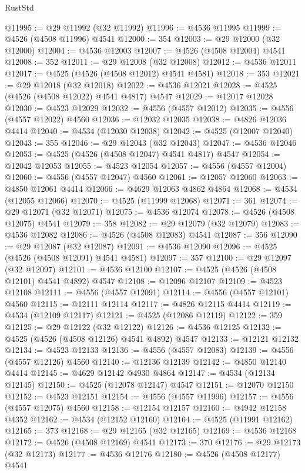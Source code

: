 \begin{lexlean}{RustStd}
\begin{coremodule}
@11995 := @29 @11992 (@32 @11992)
@11996 := @4536 @11995
@11999 := @4526 (@4508 @11996) @4541
@12000 := 354
@12003 := @29 @12000 (@32 @12000)
@12004 := @4536 @12003
@12007 := @4526 (@4508 @12004) @4541
@12008 := 352
@12011 := @29 @12008 (@32 @12008)
@12012 := @4536 @12011
@12017 := @4525 (@4526 (@4508 @12012) @4541 @4581)
@12018 := 353
@12021 := @29 @12018 (@32 @12018)
@12022 := @4536 @12021
@12028 := @4525 (@4526 (@4508 @12022) @4541 @4817) @4547
@12029 := @12017 @12028
@12030 := @4523 @12029
@12032 := @4556 (@4557 @12012)
@12035 := @4556 (@4557 @12022) @4560
@12036 := @12032 @12035
@12038 := @4826 @12036 @4414
@12040 := @4534 (@12030 @12038)
@12042 := @4525 (@12007 @12040)
@12043 := 355
@12046 := @29 @12043 (@32 @12043)
@12047 := @4536 @12046
@12053 := @4525 (@4526 (@4508 @12047) @4541 @4817) @4547
@12054 := @12042 @12053
@12055 := @4523 @12054
@12057 := @4556 (@4557 @12004)
@12060 := @4556 (@4557 @12047) @4560
@12061 := @12057 @12060
@12063 := @4850 @12061 @4414
@12066 := @4629 @12063 @4862 @4864
@12068 := @4534 (@12055 @12066)
@12070 := @4525 (@11999 @12068)
@12071 := 361
@12074 := @29 @12071 (@32 @12071)
@12075 := @4536 @12074
@12078 := @4526 (@4508 @12075) @4541
@12079 := 358
@12082 := @29 @12079 (@32 @12079)
@12083 := @4536 @12082
@12086 := @4526 (@4508 @12083) @4541
@12087 := 356
@12090 := @29 @12087 (@32 @12087)
@12091 := @4536 @12090
@12096 := @4525 (@4526 (@4508 @12091) @4541 @4581)
@12097 := 357
@12100 := @29 @12097 (@32 @12097)
@12101 := @4536 @12100
@12107 := @4525 (@4526 (@4508 @12101) @4541 @4892) @4547
@12108 := @12096 @12107
@12109 := @4523 @12108
@12111 := @4556 (@4557 @12091)
@12114 := @4556 (@4557 @12101) @4560
@12115 := @12111 @12114
@12117 := @4826 @12115 @4414
@12119 := @4534 (@12109 @12117)
@12121 := @4525 (@12086 @12119)
@12122 := 359
@12125 := @29 @12122 (@32 @12122)
@12126 := @4536 @12125
@12132 := @4525 (@4526 (@4508 @12126) @4541 @4892) @4547
@12133 := @12121 @12132
@12134 := @4523 @12133
@12136 := @4556 (@4557 @12083)
@12139 := @4556 (@4557 @12126) @4560
@12140 := @12136 @12139
@12142 := @4850 @12140 @4414
@12145 := @4629 @12142 @4930 @4864
@12147 := @4534 (@12134 @12145)
@12150 := @4525 (@12078 @12147) @4547
@12151 := @12070 @12150
@12152 := @4523 @12151
@12154 := @4556 (@4557 @11996)
@12157 := @4556 (@4557 @12075) @4560
@12158 := @12154 @12157
@12160 := @4942 @12158 @4352
@12162 := @4534 (@12152 @12160)
@12164 := @4525 (@11991 @12162)
@12165 := 373
@12168 := @29 @12165 (@32 @12165)
@12169 := @4536 @12168
@12172 := @4526 (@4508 @12169) @4541
@12173 := 370
@12176 := @29 @12173 (@32 @12173)
@12177 := @4536 @12176
@12180 := @4526 (@4508 @12177) @4541

\end{coremodule}
\end{lexlean}
